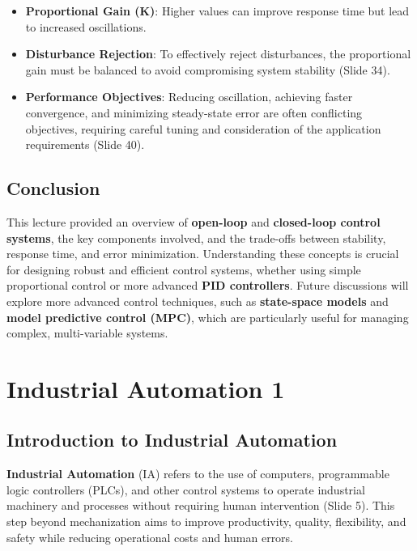 \documentclass[
  14pt,
  a4paper,
  numbers=noendperiod,
  headinclude=true,
  footinclude=true,
  DIV=calc]{scrreprt}
\providecommand{\tightlist}{%
  \setlength{\itemsep}{0pt}\setlength{\parskip}{0pt}}\usepackage{longtable,booktabs,array}
\begin{document}
\begin{itemize}
\tightlist
\item
  \textbf{Proportional Gain (Κ)}: Higher values can improve response
  time but lead to increased oscillations.
\item
  \textbf{Disturbance Rejection}: To effectively reject disturbances,
  the proportional gain must be balanced to avoid compromising system
  stability (Slide 34).
\item
  \textbf{Performance Objectives}: Reducing oscillation, achieving
  faster convergence, and minimizing steady-state error are often
  conflicting objectives, requiring careful tuning and consideration of
  the application requirements (Slide 40).
\end{itemize}

\section{Conclusion}\label{conclusion-7}

This lecture provided an overview of \textbf{open-loop} and
\textbf{closed-loop control systems}, the key components involved, and
the trade-offs between stability, response time, and error minimization.
Understanding these concepts is crucial for designing robust and
efficient control systems, whether using simple proportional control or
more advanced \textbf{PID controllers}. Future discussions will explore
more advanced control techniques, such as \textbf{state-space models}
and \textbf{model predictive control (MPC)}, which are particularly
useful for managing complex, multi-variable systems.

\chapter{Industrial Automation 1}\label{industrial-automation-1}

\section{Introduction to Industrial
Automation}\label{introduction-to-industrial-automation}

\textbf{Industrial Automation} (IA) refers to the use of computers,
programmable logic controllers (PLCs), and other control systems to
operate industrial machinery and processes without requiring human
intervention (Slide 5). This step beyond mechanization aims to improve
productivity, quality, flexibility, and safety while reducing
operational costs and human errors.
\end{document}
